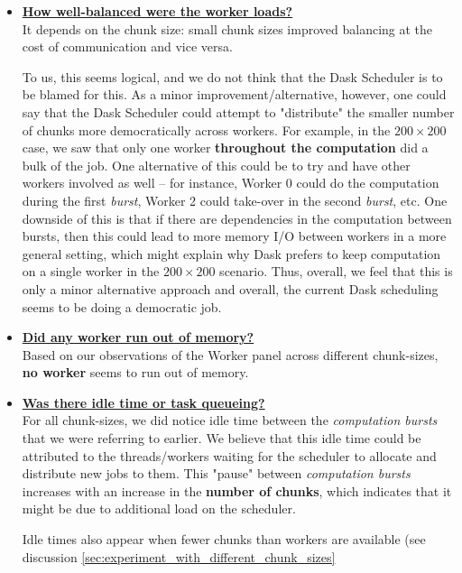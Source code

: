 \documentclass[a4paper,12pt]{article}
\begin{document}
\begin{itemize}
\item \textbf{\underline{How well-balanced were the worker loads?}}\\
  It depends on the chunk size: small chunk sizes improved balancing at the cost of communication and vice versa.

To us, this seems logical, and we do not think that the Dask Scheduler is to be blamed for this. As a minor improvement/alternative, however, one could say that the Dask Scheduler could attempt to "distribute" the smaller number of chunks more democratically across workers. For example, in the $200 \times 200$ case, we saw that only one worker \textbf{throughout the computation} did a bulk of the job. One alternative of this could be to try and have other workers involved as well -- for instance, Worker 0 could do the computation during the first \textit{burst}, Worker 2 could take-over in the second \textit{burst}, etc. One downside of this is that if there are dependencies in the computation between bursts, then this could lead to more memory I/O between workers in a more general setting, which might explain why Dask prefers to keep computation on a single worker in the $200 \times 200$ scenario. Thus, overall, we feel that this is only a minor alternative approach and overall, the current Dask scheduling seems to be doing a democratic job. 

\item \textbf{\underline{Did any worker run out of memory?}}\\
Based on our observations of the Worker panel across different chunk-sizes, \textbf{no worker} seems to run out of memory.

\item \textbf{\underline{Was there idle time or task queueing?}}\\
  For all chunk-sizes, we did notice idle time between the \textit{computation bursts} that we were referring to earlier.
  We believe that this idle time could be attributed to the threads/workers waiting for the scheduler to allocate and distribute new jobs to them.
  This "pause" between \textit{computation bursts} increases with an increase in the \textbf{number of chunks}, which indicates that it might be due to additional load on the scheduler.

  Idle times also appear when fewer chunks than workers are available (see discussion \ref{sec:experiment_with_different_chunk_sizes}


\end{itemize}
\end{document}
